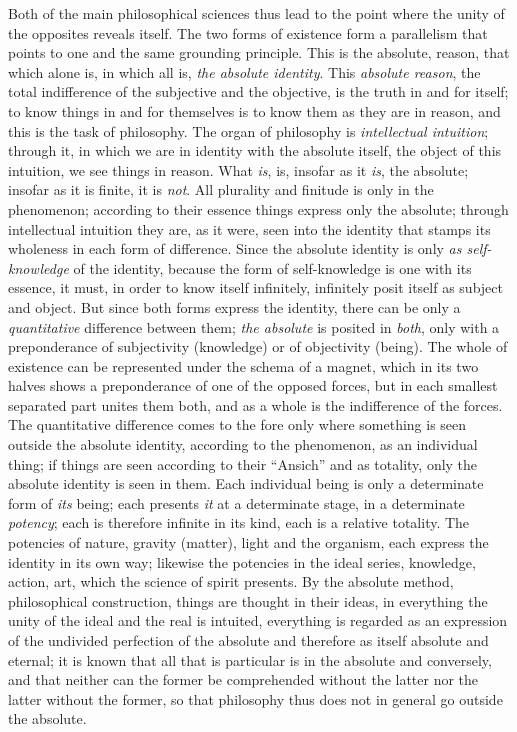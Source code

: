 Both of the main philosophical sciences thus lead to the point where the
unity of the opposites reveals itself. The two forms of existence form a
parallelism that points to one and the same grounding principle. This is
the absolute, reason, that which alone is, in which all is, \emph{the
absolute identity}. This \emph{absolute reason}, the total indifference
of the subjective and the objective, is the truth in and for itself; to
know things in and for themselves is to know them as they are in reason,
and this is the task of philosophy. The organ of philosophy is
\emph{intellectual intuition}; through it, in which we are in identity
with the absolute itself, the object of this intuition, we see things in
reason. What \emph{is}, is, insofar as it \emph{is}, the absolute;
insofar as it is finite, it is \emph{not}. All plurality and finitude is
only in the phenomenon; according to their essence things express only
the absolute; through intellectual intuition they are, as it were, seen
into the identity that stamps its wholeness in each form of difference.
Since the absolute identity is only \emph{as self-knowledge} of the
identity, because the form of self-knowledge is one with its essence, it
must, in order to know itself infinitely, infinitely posit itself as
subject and object. But since both forms express the identity, there can
be only a \emph{quantitative} difference between them; \emph{the
absolute} is posited in \emph{both}, only with a preponderance
of subjectivity (knowledge) or of objectivity (being). The whole of
existence can be represented under the schema of a magnet, which in its
two halves shows a preponderance of one of the opposed forces, but in
each smallest separated part unites them both, and as a whole is the
indifference of the forces. The quantitative difference comes to the fore
only where something is seen outside the absolute identity, according to
the phenomenon, as an individual thing; if things are seen according to
their ``Ansich'' and as totality, only the absolute identity is seen in
them. Each individual being is only a determinate form of \emph{its}
being; each presents \emph{it} at a determinate stage, in a determinate
\emph{potency}; each is therefore infinite in its kind, each is a
relative totality. The potencies of nature, gravity (matter), light and
the organism, each express the identity in its own way; likewise the
potencies in the ideal series, knowledge, action, art, which the science
of spirit presents. By the absolute method, philosophical construction,
things are thought in their ideas, in everything the unity of the ideal
and the real is intuited, everything is regarded as an expression of the
undivided perfection of the absolute and therefore as itself absolute and
eternal; it is known that all that is particular is in the absolute and
conversely, and that neither can the former be comprehended without the
latter nor the latter without the former, so that philosophy thus does
not in general go outside the absolute.

